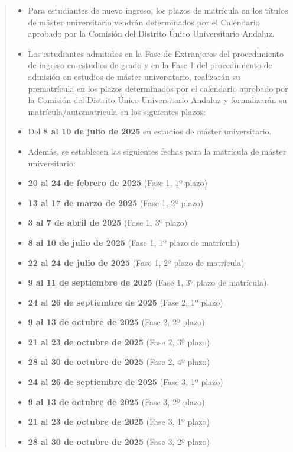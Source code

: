 \documentclass[12pt,a4paper,oneside]{report}
\begin{document}
\begin{itemize}
\begin{itemize}
\begin{quote}
\begin{itemize}
  \item Para estudiantes de nuevo ingreso, los plazos de matrícula en los títulos de máster universitario vendrán determinados por el Calendario aprobado por la Comisión del Distrito Único Universitario Andaluz.
  \item Los estudiantes admitidos en la Fase de Extranjeros del procedimiento de ingreso en estudios de grado y en la Fase 1 del procedimiento de admisión en estudios de máster universitario, realizarán su prematrícula en los plazos determinados por el calendario aprobado por la Comisión del Distrito Único Universitario Andaluz y formalizarán su matrícula/automatrícula en los siguientes plazos:
  \item Del \textbf{8 al 10 de julio de 2025} en estudios de máster universitario.
  \item Además, se establecen las siguientes fechas para la matrícula de máster universitario:
  \item \textbf{20 al 24 de febrero de 2025} (Fase 1, 1º plazo)
  \item \textbf{13 al 17 de marzo de 2025} (Fase 1, 2º plazo)
  \item \textbf{3 al 7 de abril de 2025} (Fase 1, 3º plazo)
  \item \textbf{8 al 10 de julio de 2025} (Fase 1, 1º plazo de matrícula)
  \item \textbf{22 al 24 de julio de 2025} (Fase 1, 2º plazo de matrícula)
  \item \textbf{9 al 11 de septiembre de 2025} (Fase 1, 3º plazo de matrícula)
  \item \textbf{24 al 26 de septiembre de 2025} (Fase 2, 1º plazo)
  \item \textbf{9 al 13 de octubre de 2025} (Fase 2, 2º plazo)
  \item \textbf{21 al 23 de octubre de 2025} (Fase 2, 3º plazo)
  \item \textbf{28 al 30 de octubre de 2025} (Fase 2, 4º plazo)
  \item \textbf{24 al 26 de septiembre de 2025} (Fase 3, 1º plazo)
  \item \textbf{9 al 13 de octubre de 2025} (Fase 3, 2º plazo)
  \item \textbf{21 al 23 de octubre de 2025} (Fase 3, 1º plazo)
  \item \textbf{28 al 30 de octubre de 2025} (Fase 3, 2º plazo)
\end{itemize}


\end{quote}
\end{itemize}
\end{itemize}
\end{document}
